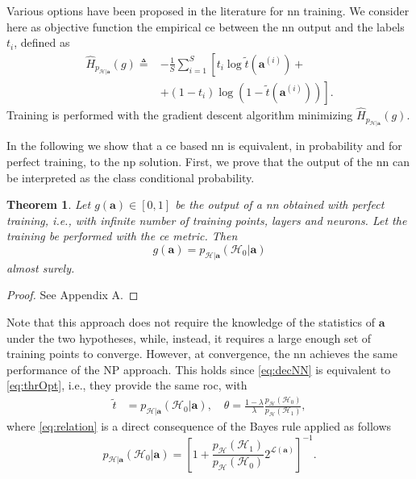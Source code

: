 \documentclass[conference,final]{IEEEtran}
\newcommand{\hatcross}[2]{\hat{H}_{#1}(#2)}
\newcommand{\gy}{g(\bm a)}
\newtheorem{theorem}{Theorem}
\begin{document}
Various options have been proposed in the literature for \ac{nn} training. We consider here as objective function the empirical \ac{ce} between the \ac{nn} output and the labels $t_i$, defined as
\begin{equation}\label{eq:ce}
\begin{split}
\hatcross{p_{\mathcal{H}|\bm a}}{g} \triangleq& -\frac{1}{S} \sum_{i=1}^{S}\left[t_i\log \tilde{t}(\bm a^{(i)}) + \right.\\
&\left. +\left(1-t_i\right)\log\left(1-\tilde{t}(\bm a^{(i)})\right)\right].
\end{split}
\end{equation}
Training is performed with the  gradient descent algorithm minimizing $\hatcross{p_{\mathcal{H}|\bm a}}{g}$.

In the following we show that a \ac{ce} based \ac{nn} is equivalent, in probability and for perfect training, to the \ac{np} solution. First, we prove that the output of the \ac{nn} can be interpreted as the class conditional probability. 
\begin{theorem}
Let $\gy \in [0,1]$ be the output of a \ac{nn} obtained with perfect training, i.e., with infinite number of training points, layers and neurons. Let the training be performed with the \ac{ce} metric. Then
\begin{equation}
	\gy = p_{\mathcal H|\bm a}(\mathcal{H}_0|\bm a)	
\end{equation}
almost surely.
\end{theorem}
\begin{proof}
See Appendix A.
\end{proof}

Note that this approach does not require the knowledge of the statistics of $\bm{a}$ under the two hypotheses, while, instead, it requires a large enough set of training points to converge.
However, at convergence, the \ac{nn} achieves the same performance of the NP approach. This holds since \eqref{eq:decNN} is equivalent to \eqref{eq:thrOpt}, i.e., they provide the same \ac{roc}, with
\begin{align}
	\label{eq:relation}
	\tilde{t} &= p_{\mathcal{H}|\bm a}(\mathcal{H}_0|\bm a), \quad 
	\theta = \frac{1-\lambda}{\lambda} \frac{p_\mathcal{H}(\mathcal{H}_0)}{p_{\mathcal{H}}(\mathcal{H}_1)},	
\end{align}  
where \eqref{eq:relation} is a direct consequence of the Bayes rule applied as follows 
\begin{equation}
	p_{\mathcal{H}|\bm a}(\mathcal{H}_0| \bm a) = \left[1+  \frac{p_{\mathcal{H}}(\mathcal{H}_1)}{p_{\mathcal{H}}(\mathcal{H}_0)} 2^{\mathcal{L}(\bm a)}\right]^{-1}.	
\end{equation}
\end{document}
